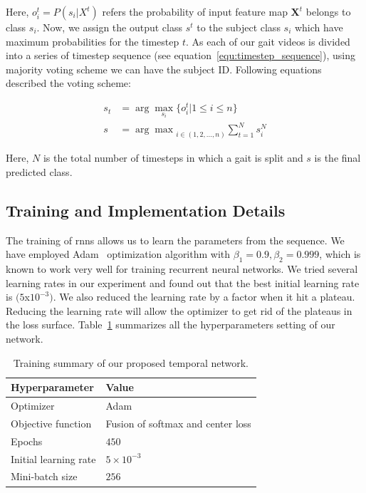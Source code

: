 Here, $o_i^t = P(s_i | X^t)$ refers the probability of input feature map $\boldsymbol X^t$ belongs to class $s_i$. Now, we assign the output class $s^t$ to the subject class $s_i$ which have maximum probabilities for the timestep $t$. As each of our gait videos is divided into a series of timestep sequence (see equation~\ref{equ:timestep_sequence}), using majority voting scheme we can have the subject ID. Following equations described the voting scheme:

\begin{equation}
\label{equ:predicted_class}
\begin{split}
s_t &=  \arg\max_{s_i}{\{o_i^t | 1 \leq i \leq n\}} \\
s &= {\arg\max}_{i\in(1, 2, ...,n)}{\sum_{t=1}^{N}s_i^N}
\end{split}
\end{equation}

Here, $ N $ is the total number of timesteps in which a gait is split and $ s $ is the final predicted class.  


\subsection{Training and Implementation Details}
The training of \gls{rnn}s allows us to learn the parameters from the sequence. We have employed Adam~\cite{Kingma_15} optimization algorithm with $\beta_1 = 0.9, \beta_2 = 0.999$, which is known to work very well for training recurrent neural networks. We tried several learning rates in our experiment and found out that the best initial learning rate is $(5$x$10^{-3})$. We also reduced the learning rate by a factor when it hit a plateau. Reducing the learning rate will allow the optimizer to get rid of the plateaus in the loss surface. Table~\ref{table:summary_tn} summarizes all the hyperparameters setting of our network.

\begin{table}
	\centering
	\caption{Training summary of our proposed temporal network. \label{table:summary_tn}}
	\begin{tabular*}{32pc}{@{\extracolsep{\fill}}ll@{}}
		\hline \noalign{\vspace{3pt}}
		\textbf{Hyperparameter} &\qquad \textbf{Value} \\ [3pt] \hline\noalign{\vspace{3pt}}
		Optimizer     			&\qquad Adam~\cite{Kingma_15} \\[3pt]
		Objective function  	&\qquad Fusion of softmax and center loss \\[3pt]
		Epochs        			&\qquad $ 450 $ \\ [3pt]
		Initial learning rate	&\qquad $5 \times 10^{-3}$  \\[3pt]
		Mini-batch size			&\qquad $ 256 $ \\
		\hline
	\end{tabular*}
\end{table}

